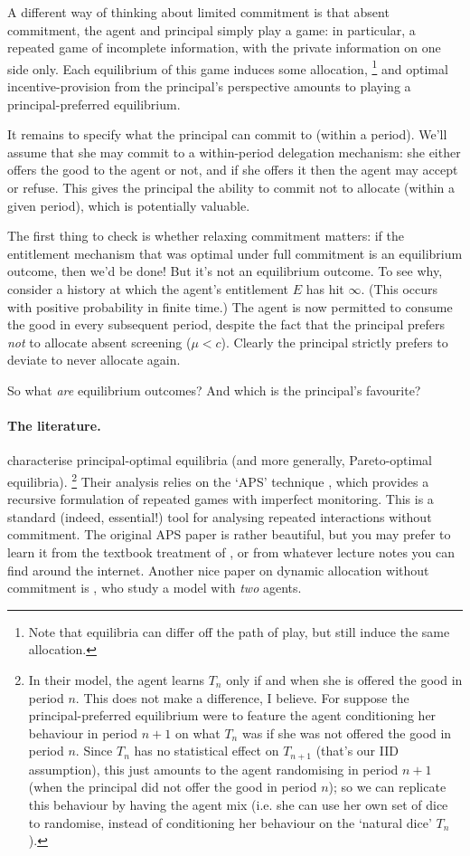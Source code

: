 A different way of thinking about limited commitment is that absent commitment, the agent and principal simply play a game: in particular, a repeated game of incomplete information, with the private information on one side only.
Each equilibrium of this game induces some allocation,%
	\footnote{Note that equilibria can differ off the path of play, but still induce the same allocation.}
and optimal incentive-provision from the principal's perspective
amounts to playing a principal-preferred equilibrium.

It remains to specify what the principal can commit to (within a period).
We'll assume that she may commit to a within-period delegation mechanism:
she either offers the good to the agent or not,
and if she offers it then the agent may accept or refuse.
This gives the principal the ability to commit not to allocate (within a given period), which is potentially valuable.


The first thing to check is whether relaxing commitment matters:
if the entitlement mechanism that was optimal under full commitment is an equilibrium outcome, then we'd be done!
But it's not an equilibrium outcome.
To see why, consider a history at which the agent's entitlement $E$ has hit $\infty$. (This occurs with positive probability in finite time.)
The agent is now permitted to consume the good in every subsequent period, despite the fact that the principal prefers \emph{not} to allocate absent screening ($\mu < c$).
Clearly the principal strictly prefers to deviate to never allocate again.

So what \emph{are} equilibrium outcomes?
And which is the principal's favourite?


\paragraph{The literature.} \textcite{LipnowskiRamos2020} characterise principal-optimal equilibria (and more generally, Pareto-optimal equilibria).%
	\footnote{In their model, the agent learns $T_n$ only if and when she is offered the good in period $n$. This does not make a difference, I believe.
	For suppose the principal-preferred equilibrium were to feature the agent conditioning her behaviour in period $n+1$
	on what $T_n$ was if she was not offered the good in period $n$.
	Since $T_n$ has no statistical effect on $T_{n+1}$ (that's our IID assumption),
	this just amounts to the agent randomising in period $n+1$ (when the principal did not offer the good in period $n$);
	so we can replicate this behaviour by having the agent mix (i.e. she can use her own set of dice to randomise, instead of conditioning her behaviour on the `natural dice' $T_n$).}
Their analysis relies on the `APS' technique \parencite{AbreuPearceStacchetti1990}, which provides a recursive formulation of repeated games with imperfect monitoring. This is a standard (indeed, essential!) tool for analysing repeated interactions without commitment.
The original APS paper is rather beautiful,
but you may prefer to learn it from the textbook treatment of \textcite{MailathSamuelson2006}, or from whatever lecture notes you can find around the internet.
Another nice paper on dynamic allocation without commitment is \textcite{DeclippelEliazFershtmanRozen2021}, who study a model with \emph{two} agents.
